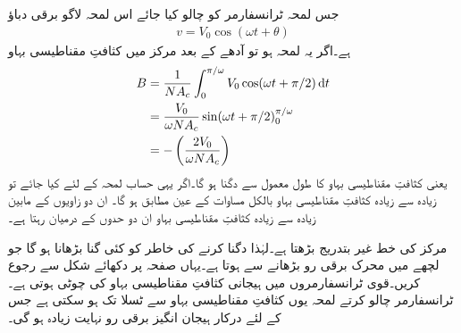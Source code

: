 جس لمحہ ٹرانسفارمر کو چالو کیا جائے اس لمحہ لاگو برقی دباؤ
\begin{align*}
v=V_0 \cos (\omega t+\theta)
\end{align*}
ہے۔اگر  یہ لمحہ ہو تو آدھے   کے بعد مرکز میں کثافتِ مقناطیسی بہاو
\begin{align*}
B&=\frac{1}{N A_c} \int_{0}^{\pi/\omega} V_0 \cos (\omega t+\pi/2) \dif t\\
&=\frac{V_0}{\omega N A_c} \sin (\omega t+\pi/2)_0^{\pi/\omega}\\
&=-\left(\frac{2 V_0}{\omega N A_c} \right)
\end{align*}
یعنی کثافتِ مقناطیسی بہاو کا طول معمول سے دگنا ہو گا۔اگر یہی حساب  لمحہ کے لئے کیا جائے تو زیادہ سے زیادہ کثافتِ مقناطیسی بہاو بالکل مساوات   کے عین مطابق ہو گا۔ ان دو زاویوں کے مابین زیادہ سے زیادہ کثافتِ مقناطیسی بہاو ان دو حدوں کے درمیان رہتا ہے۔ 

مرکز کی   خط غیر بتدریج بڑھتا ہے۔لہٰذا   دگنا کرنے کی خاطر  کو کئی گنا بڑھانا ہو گا جو لچھے میں محرک برقی رو بڑھانے سے ہوتا ہے۔یہاں صفحہ  پر دکھائے  شکل   سے رجوع کریں۔قوی ٹرانسفارمروں میں ہیجانی کثافتِ مقناطیسی بہاو کی چوٹی  ہوتی ہے۔ٹرانسفارمر چالو کرتے لمحہ یوں کثافتِ مقناطیسی بہاو   سے   ٹسلا تک ہو سکتی ہے جس کے لئے درکار ہیجان انگیز برقی رو نہایت زیادہ ہو گی۔

